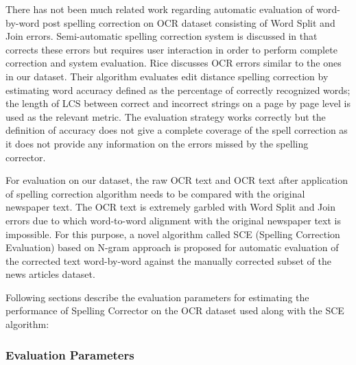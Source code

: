 \documentclass[12pt]{article}
\begin{document}
There has not been much related work regarding automatic evaluation of word-by-word post spelling correction on OCR dataset consisting of Word Split and Join errors. Semi-automatic spelling correction system is discussed in \cite{taghva2001ocrspell} that corrects these errors but requires user interaction in order to perform complete correction and system evaluation. Rice\cite{rice1996measuring} discusses OCR errors similar to the ones in our dataset. Their algorithm evaluates edit distance spelling correction by estimating word accuracy defined as the percentage of correctly recognized words; the length of LCS between correct and incorrect strings on a page by page level is used as the relevant metric. The evaluation strategy works correctly but the definition of accuracy does not give a complete coverage of the spell correction as it does not provide any information on the errors missed by the spelling corrector.

For evaluation on our dataset, the raw OCR text and OCR text after application of spelling correction algorithm needs to be compared with the original newspaper text. The OCR text is extremely garbled with Word Split and Join errors due to which word-to-word alignment with the original newspaper text is impossible. For this purpose, a novel algorithm called SCE (Spelling Correction Evaluation) based on N-gram approach is proposed for automatic evaluation of the corrected text word-by-word against the manually corrected subset of the news articles dataset. 

Following sections describe the evaluation parameters for estimating the performance of Spelling Corrector on the OCR dataset used along with the SCE algorithm:

\subsubsection{Evaluation Parameters}
\end{document}
